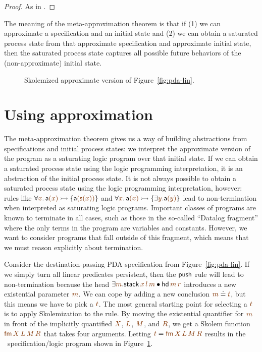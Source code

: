 \begin{proof}
As in \cite[Theorem 3]{simmons11logical}.
\end{proof}

The meaning of the meta-approximation theorem is that if (1) we can
approximate a specification and an initial state and (2) we can obtain
a saturated process state from that approximate specification
and approximate initial state, then the saturated process state captures
all possible future behaviors of the (non-approximate) initial state. 

\begin{figure}
\caption{Skolemized approximate version of Figure~\ref{fig:pda-lin}.}
\label{fig:pda-pers}
\end{figure}



\section{Using approximation}

The meta-approximation theorem gives us a way of building abstractions
from specifications and initial process states: we interpret the
approximate version of the program as a saturating logic program over
that initial state. If we can obtain a saturated process state using
the logic programming interpretation, it is an abstraction of the
initial process state. It is not always possible to obtain a saturated
process state using the logic programming interpretation, however:
rules like 
$\forall \lf{x}.\,{\sf a}\lf{(x)} \lefti \{ {\sf a}\lf{({\sf s}(x))} \}$ and 
$\forall \lf{x}.\,{\sf
  a}\lf{(x)} \lefti \{ \exists \lf{y}. {\sf a}\lf{(y)} \}$ 
lead to non-termination
when interpreted as saturating logic programs. Important classes 
of programs are known to terminate in all cases, such as those in the
so-called ``Datalog fragment'' where the only terms in the program
are variables and constants. However, we want to consider programs
that fall outside of this fragment, which means that we must 
reason explicitly about termination.

Consider the destination-passing PDA specification from
Figure~\ref{fig:pda-lin}. If we simply turn all linear predicates
persistent, then the ${\sf push}$ rule will lead to non-termination
because the head $\exists \lf{m}. {\sf stack}\,\lf{x}\,\lf{l}\,\lf{m} \fuse {\sf
  hd}\,\lf{m}\,\lf{r}$ introduces a new existential parameter $\lf{m}$. 
We can cope
by adding a new conclusion $\lf{m} \doteq \lf{t}$, but this means we 
have to pick a $\lf{t}$.
The most general starting point for selecting a $\lf{t}$ is to apply
Skolemization to the rule. By moving the existential quantifier for
$\lf{m}$ in front of the implicitly quantified $\lf{X}$, $\lf{L}$, $\lf{M}$, 
and $\lf{R}$, we
get a Skolem function $\lf{{\sf fm}\,X\,L\,M\,R}$ that takes four
arguments. Letting $\lf{t} = \lf{{\sf fm}\,X\,L\,M\,R}$ results in the
\sls~specification/logic program shown in
Figure~\ref{fig:pda-pers}.

